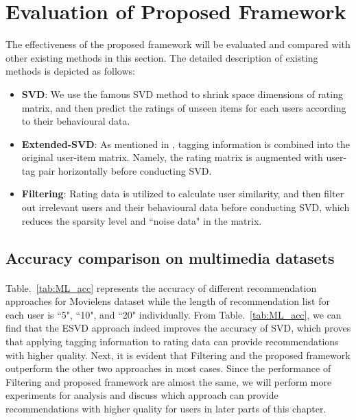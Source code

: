 \documentclass[a4paper,12pt]{report}
\begin{document}
\section{Evaluation of Proposed Framework}
The effectiveness of the proposed framework will be evaluated and compared with other existing methods in this section. The detailed description of existing methods is depicted as follows: 
\begin{itemize}
    \item \textbf{SVD}: We use the famous SVD method to shrink space dimensions of rating matrix, and then predict the ratings of unseen items for each users according to their behavioural data. 
    \item \textbf{Extended-SVD}: As mentioned in \cite{osmanli2011using}, tagging information is combined into the original user-item matrix. Namely, the rating matrix is augmented with user-tag pair horizontally before conducting SVD.
    \item \textbf{Filtering}: Rating data is utilized to calculate user similarity, and then filter out irrelevant users and their behavioural data before conducting SVD, which reduces the sparsity level and ``noise data" in the matrix.
\end{itemize}

\subsection{Accuracy comparison on multimedia datasets}
\paragraph{}
Table.~\ref{tab:ML_acc} represents the accuracy of different recommendation approaches for Movielens dataset while the length of recommendation list for each user is ``5", ``10", and ``20" individually. From Table.~\ref{tab:ML_acc}, we can find that the ESVD approach indeed improves the accuracy of SVD, which proves that applying tagging information to rating data can provide recommendations with higher quality. Next, it is evident that Filtering and the proposed framework outperform the other two approaches in most cases. Since the performance of Filtering and proposed framework are almost the same, we will perform more experiments for analysis and discuss which approach can provide recommendations with higher quality for users in later parts of this chapter.
\end{document}
